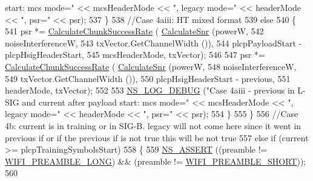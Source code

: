 \begin{DoxyCode}
{       start: mcs mode="} << mcsHeaderMode << \textcolor{stringliteral}{", legacy mode="} << headerMode << \textcolor{stringliteral}{", psr="} << psr);
537                 \}
538               \textcolor{comment}{//Case 4aiii: HT mixed format}
539               \textcolor{keywordflow}{else}
540                 \{
541                   psr *= \hyperlink{classns3_1_1InterferenceHelper_ab1c34c3f7ecef1e37ec778c0cf0e9cef}{CalculateChunkSuccessRate} (
      \hyperlink{classns3_1_1InterferenceHelper_a8f6192d041874595004c007c5a519b4b}{CalculateSnr} (powerW,
542                                                                   noiseInterferenceW,
543                                                                   txVector.GetChannelWidth ()),
544                                                     plcpPayloadStart - plcpHsigHeaderStart,
545                                                     mcsHeaderMode, txVector);
546 
547                   psr *= \hyperlink{classns3_1_1InterferenceHelper_ab1c34c3f7ecef1e37ec778c0cf0e9cef}{CalculateChunkSuccessRate} (
      \hyperlink{classns3_1_1InterferenceHelper_a8f6192d041874595004c007c5a519b4b}{CalculateSnr} (powerW,
548                                                                   noiseInterferenceW,
549                                                                   txVector.GetChannelWidth ()),
550                                                     plcpHsigHeaderStart - previous,
551                                                     headerMode, txVector);
552 
553                   \hyperlink{group__logging_ga413f1886406d49f59a6a0a89b77b4d0a}{NS\_LOG\_DEBUG} (\textcolor{stringliteral}{"Case 4aiii - previous in L-SIG and current after payload
       start: mcs mode="} << mcsHeaderMode << \textcolor{stringliteral}{", legacy mode="} << headerMode << \textcolor{stringliteral}{", psr="} << psr);
554                 \}
555             \}
556           \textcolor{comment}{//Case 4b: current is in training or in SIG-B. legacy will not come here since it went in
       previous if or if the previous if is not true this will be not true}
557           \textcolor{keywordflow}{else} \textcolor{keywordflow}{if} (current >= plcpTrainingSymbolsStart)
558             \{
559               \hyperlink{assert_8h_a6dccdb0de9b252f60088ce281c49d052}{NS\_ASSERT} ((preamble != \hyperlink{group__wifi_gga5e94a56cb338a14ffbbb19c6a41251eba12f3d9468d1630bd38bbef20df1e3eda}{WIFI\_PREAMBLE\_LONG}) && (preamble != 
      \hyperlink{group__wifi_gga5e94a56cb338a14ffbbb19c6a41251ebab9a39ca1f62d36c33ac489c4cf59745b}{WIFI\_PREAMBLE\_SHORT}));
560 

\end{DoxyCode}
